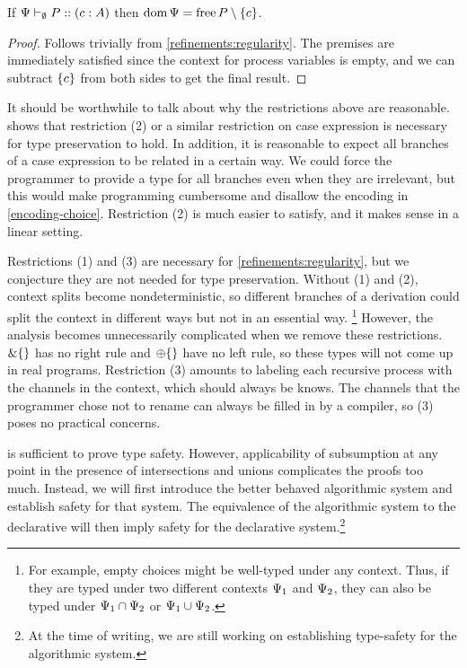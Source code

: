 \begin{corollary}
  \label{refinements:regularity-corollary}
  If ${\Psi} \vdash_{\emptyset} P :: (c : A)$ then $\operatorname{dom}\Psi = \operatorname{free} P \setminus {\lbrace c\rbrace}$.
\end{corollary}
\begin{proof}
  Follows trivially from \cref{refinements:regularity}. The premises are immediately satisfied since the context for process variables is empty, and we can subtract $\lbrace c\rbrace$ from both sides to get the final result.
\end{proof}

It should be worthwhile to talk about why the restrictions above are reasonable.  shows that restriction (2) or a similar restriction on case expression is necessary for type preservation to hold. In addition, it is reasonable to expect all branches of a case expression to be related in a certain way. We could force the programmer to provide a type for all branches even when they are irrelevant, but this would make programming cumbersome and disallow the encoding in \cref{encoding-choice}. Restriction (2) is much easier to satisfy, and it makes sense in a linear setting.

Restrictions (1) and (3) are necessary for \cref{refinements:regularity}, but we conjecture they are not needed for type preservation. Without (1) and (2), context splits become nondeterministic, so different branches of a derivation could split the context in different ways but not in an essential way.%
\footnote{For example, empty choices might be well-typed under any context. Thus, if they are typed under two different contexts $\Psi_1$ and $\Psi_2$, they can also be typed under $\Psi_1 \cap \Psi_2$ or $\Psi_1 \cup \Psi_2$.}
However, the analysis becomes unnecessarily complicated when we remove these restrictions. $\&\lbrace\rbrace$ has no right rule and $\oplus\lbrace\rbrace$ have no left rule, so these types will not come up in real programs. Restriction (3) amounts to labeling each recursive process with the channels in the context, which should always be knows. The channels that the programmer chose not to rename can always be filled in by a compiler, so (3) poses no practical concerns.


 is sufficient to prove type safety. However, applicability of subsumption at any point in the presence of intersections and unions complicates the proofs too much. Instead, we will first introduce the better behaved algorithmic system and establish safety for that system. The equivalence of the algorithmic system to the declarative will then imply safety for the declarative system.\footnote{At the time of writing, we are still working on establishing type-safety for the algorithmic system.}

